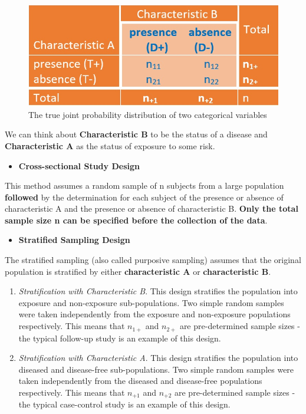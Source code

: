 \documentclass[
]{book}
\providecommand{\tightlist}{%
  \setlength{\itemsep}{0pt}\setlength{\parskip}{0pt}}
\begin{document}
\begin{figure}

{\centering \includegraphics[width=0.8\linewidth]{img12/w12-Typical2x2table} 

}

\caption{The true joint probability distribution of two categorical variables}\label{fig:unnamed-chunk-198}
\end{figure}

We can think about \textbf{Characteristic B} to be the status of a disease and \textbf{Characteristic A} as the status of exposure to some risk.

\begin{itemize}
\tightlist
\item
  \textbf{Cross-sectional Study Design}
\end{itemize}

This method assumes a random sample of n subjects from a large population \textbf{followed} by the determination for each subject of the presence or absence of characteristic A and the presence or absence of characteristic B. \textbf{Only the total sample size n can be specified before the collection of the data}.

\begin{itemize}
\tightlist
\item
  \textbf{Stratified Sampling Design}
\end{itemize}

The stratified sampling (also called purposive sampling) assumes that the original population is stratified by either \textbf{characteristic A} or \textbf{characteristic B}.

\begin{enumerate}
\def\labelenumi{\arabic{enumi}.}
\item
  \emph{Stratification with Characteristic B}. This design stratifies the population into exposure and non-exposure sub-populations. Two simple random samples were taken independently from the exposure and non-exposure populations respectively. This means that \(n_{1+}\) and \(n_{2+}\) are pre-determined sample sizes - the typical follow-up study is an example of this design.
\item
  \emph{Stratification with Characteristic A}. This design stratifies the population into diseased and disease-free sub-populations. Two simple random samples were taken independently from the diseased and disease-free populations respectively. This means that \(n_{+1}\) and \(n_{+2}\) are pre-determined sample sizes - the typical case-control study is an example of this design.
\end{enumerate}
\end{document}
